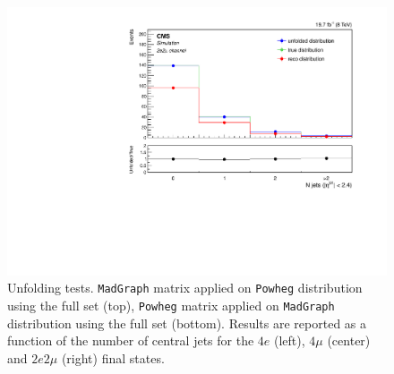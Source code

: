 \begin{figure}[hbtp]
\begin{center}
    \includegraphics[width=0.8\cmsFigWidth]{Figures/Unfolding/MCTests/CentralJets_ZZTo2e2m_PowMatrix_MadDistr_FullSample_fr}  
 \caption{Unfolding tests. \texttt{MadGraph} matrix applied on \texttt{Powheg} distribution using the full set (top), \texttt{Powheg} matrix applied on \texttt{MadGraph} distribution using the full set (bottom). Results are reported as a function of the number of central jets for the $4e$ (left), $4\mu$ (center) and $2e2\mu$ (right) final states.}
    \label{fig:MCtest_CentralJets2}
  \end{center}
\end{figure}
\clearpage 
